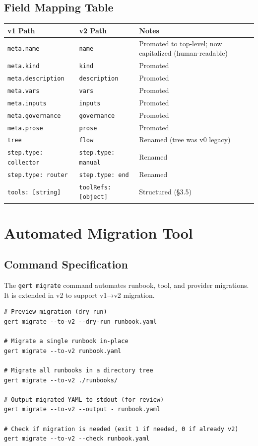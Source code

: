 \subsection{Field Mapping Table}

\begin{center}
\begin{tabular}{llp{6cm}}
\textbf{v1 Path} & \textbf{v2 Path} & \textbf{Notes} \\
\hline
\texttt{meta.name} & \texttt{name} & Promoted to top-level; now capitalized (human-readable) \\
\texttt{meta.kind} & \texttt{kind} & Promoted \\
\texttt{meta.description} & \texttt{description} & Promoted \\
\texttt{meta.vars} & \texttt{vars} & Promoted \\
\texttt{meta.inputs} & \texttt{inputs} & Promoted \\
\texttt{meta.governance} & \texttt{governance} & Promoted \\
\texttt{meta.prose} & \texttt{prose} & Promoted \\
\texttt{tree} & \texttt{flow} & Renamed (tree was v0 legacy) \\
\texttt{step.type: collector} & \texttt{step.type: manual} & Renamed \\
\texttt{step.type: router} & \texttt{step.type: end} & Renamed \\
\texttt{tools: [string]} & \texttt{toolRefs: [object]} & Structured (§3.5) \\
\end{tabular}
\end{center}

\section{Automated Migration Tool}
\label{sec:migrate-tool}

\subsection{Command Specification}

The \texttt{gert migrate} command automates runbook, tool, and provider migrations. It is extended in v2 to support v1→v2 migration.

\begin{verbatim}
# Preview migration (dry-run)
gert migrate --to-v2 --dry-run runbook.yaml

# Migrate a single runbook in-place
gert migrate --to-v2 runbook.yaml

# Migrate all runbooks in a directory tree
gert migrate --to-v2 ./runbooks/

# Output migrated YAML to stdout (for review)
gert migrate --to-v2 --output - runbook.yaml

# Check if migration is needed (exit 1 if needed, 0 if already v2)
gert migrate --to-v2 --check runbook.yaml
\end{verbatim}

